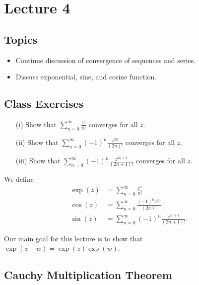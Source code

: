 \documentclass[a4paper]{report}
\begin{document}
\section{Lecture 4}

\subsection{Topics}

\begin{itemize}
    \item Continue discussion of convergence of sequences and series.
    \item Discuss exponential, sine, and cosine function.
\end{itemize}

\subsection{Class Exercises}

\begin{enumerate}
    \item[(i)] Show that \( \sum_{ n=0  }^{  \infty  } \frac{ z^{n} }{ n! }  \) converges for all \( z  \).
    \item[(ii)] Show that \( \sum_{ n= 0  }^{  \infty  } (-1)^{n} \frac{ z^{2n} }{ (2n)! }  \) converges for all \( z \).
    \item[(iii)] Show that \( \sum_{ n=0 }^{ \infty  } (-1)^{n} \frac{ z^{2n+1} }{ (2n+1)! }  \) converges for all \( z \).
\end{enumerate}

\begin{definition}
    We define 
    \begin{align*}
        \exp(z) &= \sum_{ n= 0  }^{  \infty  } \frac{ z^{n} }{ n! }  \\
        \cos(z) &= \sum_{ n=0 }^{ \infty  } \frac{ (-1)^{n} z^{2n} }{ (2n)! } \\
        \sin(z) &= \sum_{ n=0 }^{ \infty   } (-1)^{n} \frac{ z^{2n+1} }{ (2n+1)! }.
    \end{align*}
\end{definition}

Our main goal for this lecture is to show that \( \exp(z+w) = \exp(z) \exp(w) \).

\subsection{Cauchy Multiplication Theorem}
\end{document}
